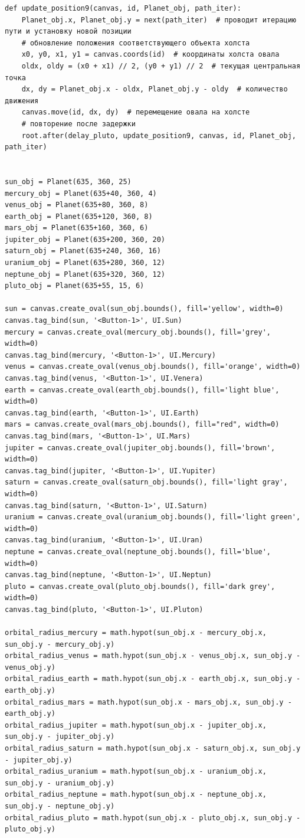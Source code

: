 \documentclass[11pt,a4paper]{report}
\begin{document}
\begin{verbatim}
def update_position9(canvas, id, Planet_obj, path_iter):
    Planet_obj.x, Planet_obj.y = next(path_iter)  # проводит итерацию пути и установку новой позиции
    # обновление положения соответствующего объекта холста
    x0, y0, x1, y1 = canvas.coords(id)  # координаты холста овала
    oldx, oldy = (x0 + x1) // 2, (y0 + y1) // 2  # текущая центральная точка
    dx, dy = Planet_obj.x - oldx, Planet_obj.y - oldy  # количество движения
    canvas.move(id, dx, dy)  # перемещение овала на холсте
    # повторение после задержки
    root.after(delay_pluto, update_position9, canvas, id, Planet_obj, path_iter)


sun_obj = Planet(635, 360, 25)
mercury_obj = Planet(635+40, 360, 4)
venus_obj = Planet(635+80, 360, 8)
earth_obj = Planet(635+120, 360, 8)
mars_obj = Planet(635+160, 360, 6)
jupiter_obj = Planet(635+200, 360, 20)
saturn_obj = Planet(635+240, 360, 16)
uranium_obj = Planet(635+280, 360, 12)
neptune_obj = Planet(635+320, 360, 12)
pluto_obj = Planet(635+55, 15, 6)

sun = canvas.create_oval(sun_obj.bounds(), fill='yellow', width=0)
canvas.tag_bind(sun, '<Button-1>', UI.Sun)
mercury = canvas.create_oval(mercury_obj.bounds(), fill='grey', width=0)
canvas.tag_bind(mercury, '<Button-1>', UI.Mercury)
venus = canvas.create_oval(venus_obj.bounds(), fill='orange', width=0)
canvas.tag_bind(venus, '<Button-1>', UI.Venera)
earth = canvas.create_oval(earth_obj.bounds(), fill='light blue', width=0)
canvas.tag_bind(earth, '<Button-1>', UI.Earth)
mars = canvas.create_oval(mars_obj.bounds(), fill="red", width=0)
canvas.tag_bind(mars, '<Button-1>', UI.Mars)
jupiter = canvas.create_oval(jupiter_obj.bounds(), fill='brown', width=0)
canvas.tag_bind(jupiter, '<Button-1>', UI.Yupiter)
saturn = canvas.create_oval(saturn_obj.bounds(), fill='light gray', width=0)
canvas.tag_bind(saturn, '<Button-1>', UI.Saturn)
uranium = canvas.create_oval(uranium_obj.bounds(), fill='light green', width=0)
canvas.tag_bind(uranium, '<Button-1>', UI.Uran)
neptune = canvas.create_oval(neptune_obj.bounds(), fill='blue', width=0)
canvas.tag_bind(neptune, '<Button-1>', UI.Neptun)
pluto = canvas.create_oval(pluto_obj.bounds(), fill='dark grey', width=0)
canvas.tag_bind(pluto, '<Button-1>', UI.Pluton)

orbital_radius_mercury = math.hypot(sun_obj.x - mercury_obj.x, sun_obj.y - mercury_obj.y)
orbital_radius_venus = math.hypot(sun_obj.x - venus_obj.x, sun_obj.y - venus_obj.y)
orbital_radius_earth = math.hypot(sun_obj.x - earth_obj.x, sun_obj.y - earth_obj.y)
orbital_radius_mars = math.hypot(sun_obj.x - mars_obj.x, sun_obj.y - earth_obj.y)
orbital_radius_jupiter = math.hypot(sun_obj.x - jupiter_obj.x, sun_obj.y - jupiter_obj.y)
orbital_radius_saturn = math.hypot(sun_obj.x - saturn_obj.x, sun_obj.y - jupiter_obj.y)
orbital_radius_uranium = math.hypot(sun_obj.x - uranium_obj.x, sun_obj.y - uranium_obj.y)
orbital_radius_neptune = math.hypot(sun_obj.x - neptune_obj.x, sun_obj.y - neptune_obj.y)
orbital_radius_pluto = math.hypot(sun_obj.x - pluto_obj.x, sun_obj.y - pluto_obj.y)


\end{verbatim}
\end{document}
